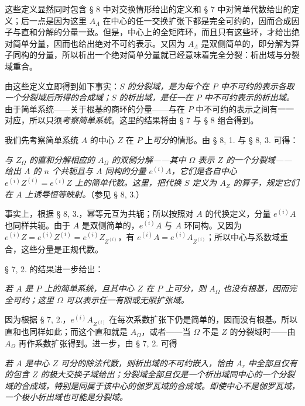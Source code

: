 这些定义显然同时包含 § 8 中对交换情形给出的定义和 § 7 中对简单代数给出的定义；后一点是因为这里 \(A_\Lambda\) 在中心的任一交换扩张下都是完全可约的，因而合成因子与直和分解的分量一致。但是，中心上的全矩阵环，而且只有这些环，才给出绝对简单分量，因而也给出绝对不可约表示。又因为 \(A_\Lambda\) 是双侧简单的，即分解为算子同构的分量，所以析出一个绝对简单分量就已经意味着完全分裂：析出域与分裂域重合。

由这些定义立即得到如下事实：\emph{\(S\) 的分裂域，是为每个在 \(P\) 中不可约的表示各取一个分裂域后所得的合成域；\(S\) 的析出域，是任一在 \(P\) 中不可约表示的析出域。} 由于简单系统——关于根基的商环的分量——与在 \(P\) 中不可约的表示之间有一一对应，所以只须\emph{考察简单系统}。这里的结果将由 § 7 与 § 8 组合得到。


\noindent\textbf{} 我们先考察简单系统 \(A\) 的中心 \(Z\) 在 \(P\) 上\emph{可分}的情形。由 § 8, 1. 与 § 8, 3. 可得：

\emph{与 \(Z_\Omega\) 的直和分解相应的 \(A_\Omega\) 的双侧分解——其中 \(\Omega\) 表示 \(Z\) 的一个分裂域——给出 \(A\) 的 \(n\) 个共轭且与 \(A\) 同构的分量 \(e^{(i)}A\)，它们是各自中心 \(e^{(i)}Z^{(i)}=e^{(i)}Z\) 上的简单代数。这里，把代换 \(S\) 定义为 \(A_Z\) 的算子，规定它们在 \(A\) 上诱导恒等映射。}（参见 § 8, 3.）

事实上，根据 § 8, 3.，幂等元互为共轭；所以按照对 \(A\) 的代换定义，分量 \(e^{(i)}A\) 也同样共轭。由于 \(A\) 是双侧简单的，\(e^{(i)}A\) 与 \(A\) 环同构。又因为 \(e^{(i)}Z=e^{(i)}Z^{(i)}=e^{(i)}Z_{Z^{(i)}}\)，有 \(e^{(i)}A=e^{(i)}A_{Z^{(i)}}\)；所以中心与系数域重合，这些分量是正规代数。

§ 7, 2. 的结果进一步给出：

\emph{若 \(A\) 是 \(P\) 上的简单系统，且其中心 \(Z\) 在 \(P\) 上可分，则 \(A_\Omega\) 也没有根基，因而完全可约；这里 \(\Omega\) 可以表示任一有限或无限扩张域。}

因为根据 § 7, 2.，\(e^{(i)}A_{Z^{(i)}}\) 在每次系数扩张下仍是简单的，因而没有根基。所以直和也同样如此；而这个直和就是 \(A_\Omega\)，或者——当 \(\Omega\) 不是 \(Z\) 的分裂域时——由 \(A_\Omega\) 再作系数扩张得到。进一步，由 § 7, 2. 可得

\begin{center}
\textbf{}
\end{center}

\emph{若 \(A\) 是中心 \(Z\) 可分的除法代数，则析出域的不可约嵌入，恰由 \(A_r\) 中全部且仅有的包含 \(Z\) 的极大交换子域给出；分裂域全部且仅是一个析出域同中心的一个分裂域的合成域，特别是同属于该中心的伽罗瓦域的合成域。即使中心不是伽罗瓦域，一个极小析出域也可能是分裂域。}

